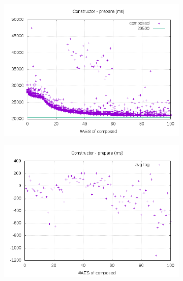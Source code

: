\documentclass[10pt,a4paper]{article}
\begin{document}
\begin{figure}[h]
    \centering
    \begin{subfigure}[t]{0.3\textwidth}
        \includegraphics[width=\textwidth]{const_prepare_plots}
        \caption{}
        \label{prepare composed}
    \end{subfigure}
    \begin{subfigure}[t]{0.3\textwidth}
        \includegraphics[width=\textwidth]{const_prepare_avg}
        \caption{}
        \label{prepare tag}
    \end{subfigure}
    \begin{subfigure}[t]{0.3\textwidth}

\end{subfigure}
\end{figure}
\end{document}
